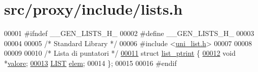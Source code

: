 \hypertarget{lists_8h_source}{
\section{src/proxy/include/lists.h}
}

\begin{DoxyCode}
00001 \textcolor{preprocessor}{#ifndef \_\_GEN\_LISTS\_H\_}
00002 \textcolor{preprocessor}{}\textcolor{preprocessor}{#define \_\_GEN\_LISTS\_H\_}
00003 \textcolor{preprocessor}{}
00004 
00005 \textcolor{comment}{/*      Standard Library        */}
00006 \textcolor{preprocessor}{#include <\hyperlink{uni__list_8h}{uni_list.h}>}
00007 
00008 
00009 
00010 \textcolor{comment}{/* Lista di puntatori */}
\hypertarget{lists_8h_source_l00011}{}\hyperlink{structlist__ptrint}{00011} \textcolor{keyword}{struct }\hyperlink{structlist__ptrint}{list_ptrint} \{
\hypertarget{lists_8h_source_l00012}{}\hyperlink{structlist__ptrint_a5c56a717f43a7ef15972bfd77dc644b4}{00012}         \textcolor{keywordtype}{void} *\hyperlink{structlist__ptrint_a5c56a717f43a7ef15972bfd77dc644b4}{valore};
\hypertarget{lists_8h_source_l00013}{}\hyperlink{structlist__ptrint_a39c87bcd548089f52d94807b0e5771ac}{00013}         \hyperlink{struct____mialista____}{LIST} \hyperlink{structlist__ptrint_a39c87bcd548089f52d94807b0e5771ac}{elem};
00014 \};
00015 
00016 \textcolor{preprocessor}{#endif}
\end{DoxyCode}
